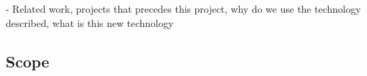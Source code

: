 - Related work, projects that precedes this project, why do we use the technology described, what is this new technology
\subsection{Scope}